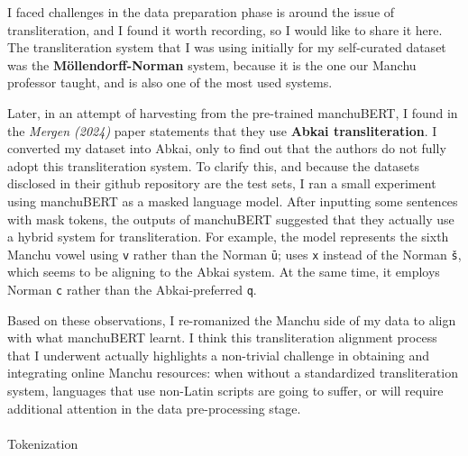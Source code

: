 \documentclass[
  letterpaper,
  DIV=11,
  numbers=noendperiod]{scrartcl}
\makeatletter
\let\oldparagraph\paragraph
\renewcommand{\paragraph}{
    \@ifstar
      \xxxParagraphStar
      \xxxParagraphNoStar
  }
\newcommand{\xxxParagraphStar}[1]{\oldparagraph*{#1}\mbox{}}
\newcommand{\xxxParagraphNoStar}[1]{\oldparagraph{#1}\mbox{}}
\makeatother
\begin{document}
\begin{tcolorbox}[enhanced jigsaw, coltitle=black, toprule=.15mm, colframe=quarto-callout-note-color-frame, opacitybacktitle=0.6, title=\textcolor{quarto-callout-note-color}{\faInfo}\hspace{0.5em}{The issue of Transliteration Alignment}, opacityback=0, arc=.35mm, titlerule=0mm, breakable, colbacktitle=quarto-callout-note-color!10!white, toptitle=1mm, colback=white, left=2mm, leftrule=.75mm, bottomtitle=1mm, rightrule=.15mm, bottomrule=.15mm]

I faced challenges in the data preparation phase is around the issue of
transliteration, and I found it worth recording, so I would like to
share it here. The transliteration system that I was using initially for
my self-curated dataset was the \textbf{Möllendorff-Norman} system,
because it is the one our Manchu professor taught, and is also one of
the most used systems.

Later, in an attempt of harvesting from the pre-trained manchuBERT, I
found in the \emph{Mergen (2024)} paper statements that they use
\textbf{Abkai transliteration}. I converted my dataset into Abkai, only
to find out that the authors do not fully adopt this transliteration
system. To clarify this, and because the datasets disclosed in their
github repository are the test sets, I ran a small experiment using
manchuBERT as a masked language model. After inputting some sentences
with mask tokens, the outputs of manchuBERT suggested that they actually
use a hybrid system for transliteration. For example, the model
represents the sixth Manchu vowel using \texttt{v} rather than the
Norman \texttt{ū}; uses \texttt{x} instead of the Norman \texttt{š},
which seems to be aligning to the Abkai system. At the same time, it
employs Norman \texttt{c} rather than the Abkai-preferred \texttt{q}.

Based on these observations, I re-romanized the Manchu side of my data
to align with what manchuBERT learnt. I think this transliteration
alignment process that I underwent actually highlights a non-trivial
challenge in obtaining and integrating online Manchu resources: when
without a standardized transliteration system, languages that use
non-Latin scripts are going to suffer, or will require additional
attention in the data pre-processing stage.

\end{tcolorbox}

\paragraph{Tokenization}\label{tokenization}
\end{document}
